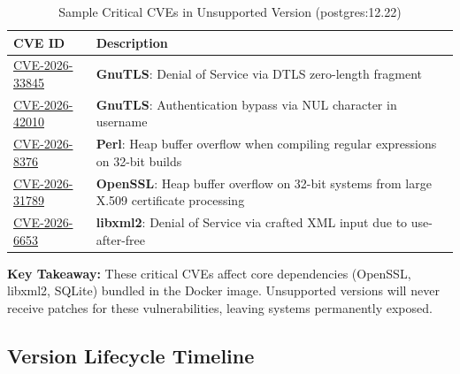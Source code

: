 \documentclass[11pt, a4paper]{article}
\begin{document}
\begin{table}[htbp]
\centering
\caption{Sample Critical CVEs in Unsupported Version (postgres:12.22)}
\label{tab:cve-examples}
\small
\begin{tabular}{@{}p{3cm}p{10cm}@{}}
\toprule
\textbf{CVE ID} & \textbf{Description} \\ \midrule
\href{https://nvd.nist.gov/vuln/detail/CVE-2026-33845}{CVE-2026-33845} & \textbf{GnuTLS}: Denial of Service via DTLS zero-length fragment \\
\href{https://nvd.nist.gov/vuln/detail/CVE-2026-42010}{CVE-2026-42010} & \textbf{GnuTLS}: Authentication bypass via NUL character in username \\
\href{https://nvd.nist.gov/vuln/detail/CVE-2026-8376}{CVE-2026-8376} & \textbf{Perl}: Heap buffer overflow when compiling regular expressions on 32-bit builds \\
\href{https://nvd.nist.gov/vuln/detail/CVE-2026-31789}{CVE-2026-31789} & \textbf{OpenSSL}: Heap buffer overflow on 32-bit systems from large X.509 certificate processing \\
\href{https://nvd.nist.gov/vuln/detail/CVE-2026-6653}{CVE-2026-6653} & \textbf{libxml2}: Denial of Service via crafted XML input due to use-after-free \\
\bottomrule
\end{tabular}
\end{table}

\textbf{Key Takeaway:} These critical CVEs affect core dependencies (OpenSSL, libxml2, SQLite) bundled in the Docker image. Unsupported versions will never receive patches for these vulnerabilities, leaving systems permanently exposed.


\subsection{Version Lifecycle Timeline}
\end{document}
